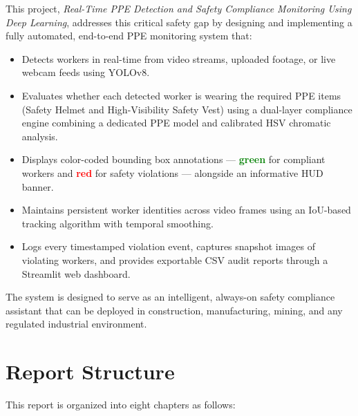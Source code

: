 \documentclass[12pt,a4paper]{report}
\begin{document}
This project, \textit{Real-Time PPE Detection and Safety Compliance Monitoring Using Deep Learning}, addresses this critical safety gap by designing and implementing a fully automated, end-to-end PPE monitoring system that:
\begin{itemize}
    \item Detects workers in real-time from video streams, uploaded footage, or live webcam feeds using YOLOv8.
    \item Evaluates whether each detected worker is wearing the required PPE items (Safety Helmet and High-Visibility Safety Vest) using a dual-layer compliance engine combining a dedicated PPE model and calibrated HSV chromatic analysis.
    \item Displays color-coded bounding box annotations — \textcolor{green}{\textbf{green}} for compliant workers and \textcolor{red}{\textbf{red}} for safety violations — alongside an informative HUD banner.
    \item Maintains persistent worker identities across video frames using an IoU-based tracking algorithm with temporal smoothing.
    \item Logs every timestamped violation event, captures snapshot images of violating workers, and provides exportable CSV audit reports through a Streamlit web dashboard.
\end{itemize}

The system is designed to serve as an intelligent, always-on safety compliance assistant that can be deployed in construction, manufacturing, mining, and any regulated industrial environment.

\section{Report Structure}

This report is organized into eight chapters as follows:
\end{document}

